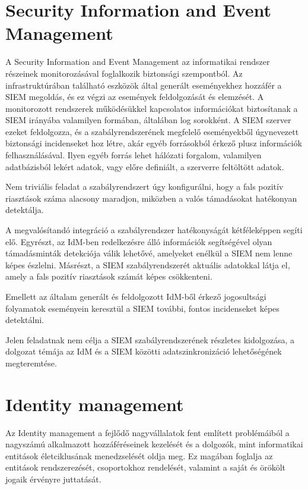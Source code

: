 \section{Security Information and Event Management}

A Security Information and Event Management az informatikai rendszer részeinek monitorozásával foglalkozik biztonsági szempontból. Az infrastruktúrában található eszközök által generált eseményekhez hozzáfér a SIEM megoldás, és ez végzi az események feldolgozását és elemzését. A monitorozott rendszerek működésükkel kapcsolatos információkat biztosítanak a SIEM irányába valamilyen formában, általában log sorokként. A SIEM szerver ezeket feldolgozza, és a szabályrendszerének megfelelő eseményekből úgynevezett biztonsági incidenseket hoz létre, akár egyéb forrásokból érkező plusz információk felhasználásával. Ilyen egyéb forrás lehet hálózati forgalom, valamilyen adatbázisból lekért adatok, vagy előre definiált, a szerverre feltöltött adatok. 

Nem triviális feladat a szabályrendszert úgy konfigurálni, hogy a fals pozitív riasztások száma alacsony maradjon, miközben a valós támadásokat hatékonyan detektálja. 

A megvalósítandó integráció a szabályrendszer hatékonyságát kétféleképpen segíti elő. Egyrészt, az IdM-ben redelkezésre álló információk segítségével olyan támadásminták detekciója válik lehetővé, amelyeket enélkül a SIEM nem lenne képes észlelni. Másrészt, a SIEM szabályrendszerét aktuális adatokkal látja el, amely a fals pozitív riasztások számát képes csökkenteni.

Emellett az általam generált és feldolgozott IdM-ből érkező jogosultsági folyamatok eseményein keresztül a SIEM további, fontos incidenseket képes detektálni.

Jelen feladatnak nem célja a SIEM szabályrendszerének részletes kidolgozása, a dolgozat témája az IdM és a SIEM közötti adatszinkronizáció lehetőségének megteremtése.

\section{Identity management}

Az Identity management a fejlődő nagyvállalatok fent említett problémáiból a nagyszámú alkalmazott hozzáféréseinek kezelését és a dolgozók, mint informatikai entitások életciklusának menedzselését oldja meg. Ez magában foglalja az entitások  rendszerezését, csoportokhoz rendelését, valamint a saját és örökölt jogaik érvényre juttatását.

